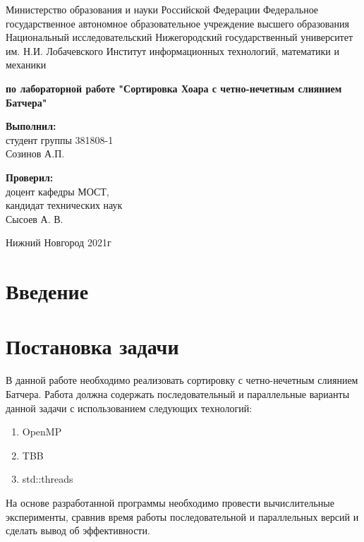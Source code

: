 \documentclass{report}
\begin{document}
\begin{titlepage}

\begin{center}Министерство образования и науки Российской Федерации 
Федеральное государственное автономное образовательное учреждение 
высшего образования \\ Национальный исследовательский 
Нижегородский государственный университет им. Н.И. Лобачевского 
Институт информационных технологий, математики и механики

\vspace{8em}
\textbf{ по лабораторной работе "Сортировка Хоара с четно-нечетным слиянием Батчера"} \end{center}

\vspace{8em}

\begin{flushright}  \textbf{Выполнил:} \\ студент группы 381808-1  \\ Созинов А.П. \end{flushright}
\begin{flushright}  \textbf{Проверил:}  \\ доцент кафедры МОСТ, \\ кандидат технических наук \\ Сысоев А. В.\\ \end{flushright}

\vspace{\fill}
\begin{center} Нижний Новгород  2021г \end{center}
\end{titlepage}

\setcounter{page}{2}

\tableofcontents

\newpage
\section*{Введение}


\newpage
\section*{Постановка задачи}
\par В данной работе необходимо реализовать сортировку с четно-нечетным слиянием Батчера.
Работа должна содержать последовательный и параллельные варианты данной 
задачи с использованием следующих технологий:
\begin{enumerate}
\item OpenMP
\item TBB
\item std::threads
\end{enumerate}
\par На основе разработанной программы необходимо провести вычислительные эксперименты, сравнив
время работы последовательной и параллельных версий и сделать вывод об эффективности.
\end{document}
